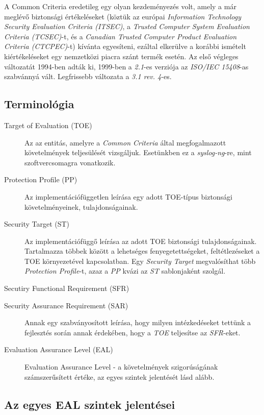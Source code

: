 A Common Criteria eredetileg egy olyan kezdeményezés volt, amely a már meglévő biztonsági
értékeléseket (köztük az európai \emph{Information Technology Security Evaluation Criteria (ITSEC)},
a \emph{Trusted Computer System Evaluation Criteria (TCSEC)}-t, és a
\emph{Canadian Trusted Computer Product Evaluation Criteria (CTCPEC)}-t) kívánta egyesíteni, ezáltal
elkerülve a korábbi ismételt kiértékeléseket egy nemzetközi piacra szánt termék esetén.  Az első
végleges változatát 1994-ben adták ki, 1999-ben a \emph{2.1}-es verziója az \emph{ISO/IEC 15408}-as
szabvánnyá vált. Legfrissebb változata a \emph{3.1 rev. 4}-es.

\subsection{Terminológia}

\begin{description}
    \item[Target of Evaluation (TOE)] {Az az entitás, amelyre a \emph{Common Criteria} által
        megfogalmazott követelmények teljesülését vizsgáljuk. Esetünkben ez a \emph{syslog-ng}-re,
        mint szoftvercsomagra vonatkozik.}
    \item[Protection Profile (PP)] { Az implementációfüggetlen leírása egy adott TOE-típus
        biztonsági követelményeinek, tulajdonságainak. }
    \item[Security Target (ST)] { Az implementációfüggő leírása az adott TOE biztonsági
        tulajdonságainak. Tartalmazza többek között a lehetséges fenyegetettségeket, feltétlezéseket
        a TOE környezetével kapcsolatban. Egy \emph{Security Target} megvalósíthat több
        \emph{Protection Profile}-t, azaz a \emph{PP} kvázi az \emph{ST} sablonjaként szolgál. }
    \item[Secutiry Functional Requirement (SFR)] { }
    \item[Security Assurance Requirement (SAR)] { Annak egy szabványosított leírása, hogy milyen
        intézkedéseket tettünk a fejlesztés során annak érdekében, hogy a \emph{TOE} teljesítse az
        \emph{SFR}-eket.}
    \item[Evaluation Assurance Level (EAL)]{Evaluation Assurance Level - a követelmények
        szigorúságának számszerűsített értéke, az egyes szintek jelentését lásd alább.}
\end{description}

\subsection{Az egyes EAL szintek jelentései}


